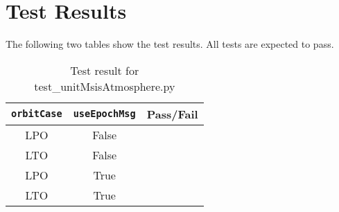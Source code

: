 \section{Test Results}
The following two tables show the test results.  All tests are expected to pass.


\begin{table}[H]
	\caption{Test result for test\_unitMsisAtmosphere.py}
	\label{tab:results}
	\centering \fontsize{10}{10}\selectfont
	\begin{tabular}{c  | c  | c} %
		\hline\hline
		{\tt orbitCase} & {\tt useEpochMsg} &  \textbf{Pass/Fail} \\ 
		\hline
		LPO & False &   \\ 
		LTO & False &   \\ 
		LPO & True &   \\ 
		LTO & True &   \\ 
		\hline
		\hline
	\end{tabular}
\end{table}



